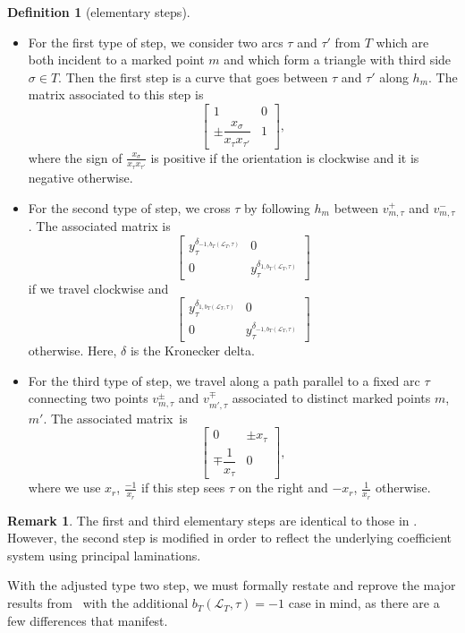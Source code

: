 \documentclass[pdftex]{sigma}
\numberwithin{equation}{section}
\theoremstyle{definition}
\newtheorem{Definition}[Theorem]{Definition}
\newtheorem{Remark}[Theorem]{Remark}
\begin{document}
\begin{Definition}[elementary steps]\label{definition:elementarysteps} \quad
\begin{itemize}\itemsep=0pt
\item For the first type of step, we consider two arcs $\tau$ and $\tau'$ from $T$ which are both incident to a marked point $m$ and which form a triangle with third side $\sigma\in T$. Then the first step is a curve that goes between $\tau$ and $\tau'$ along $h_m$. The matrix associated to this step is
\[
\left[\begin{matrix}
1 & 0\\
\pm\dfrac{x_{\sigma}}{x_{\tau}x_{\tau'}} & 1
\end{matrix}\right],
\]
where the sign of $\frac{x_{\sigma}}{x_{\tau}x_{\tau'}}$ is positive if the orientation is clockwise and it is negative otherwise.

\item For the second type of step, we cross $\tau$ by following $h_m$ between $v^{+}_{m, \tau}$ and $v^{-}_{m, \tau}$. The associated matrix is
\[
\begin{bmatrix}
y_{\tau}^{\delta_{-1, b_T(\mathcal{L}_T, \tau)}} & 0\\
0 & y_{\tau}^{\delta_{1, b_T(\mathcal{L}_T, \tau)}}
\end{bmatrix}
\] if we travel clockwise and{\samepage
\[
\begin{bmatrix}
y_{\tau}^{\delta_{1, b_T(\mathcal{L}_T, \tau)}} & 0\\
0 & y_{\tau}^{\delta_{-1, b_T(\mathcal{L}_T, \tau)}}
\end{bmatrix}
\] otherwise. Here, $\delta$ is the Kronecker delta.}

\item For the third type of step, we travel along a path parallel to a fixed arc $\tau$ connecting two points $v^{\pm}_{m, \tau}$ and $v^{\mp}_{m', \tau}$ associated to distinct marked points $m$, $m'$. The associated matrix~is
\[\begin{bmatrix}
0 & \pm x_{\tau}\\
\mp \dfrac{1}{x_{\tau}} & 0
\end{bmatrix},\] where we use $x_r$, $\frac{-1}{x_r}$ if this step sees $\tau$ on the right and $-x_r$, $\frac{1}{x_r}$ otherwise.
\end{itemize}

\begin{Remark}
The first and third elementary steps are identical to those in \cite{MW13}. However, the second step is modified in order to reflect the underlying coefficient system using principal laminations.
\end{Remark}

With the adjusted type two step, we must formally restate and reprove the major results from~\cite[Section 5]{MW13} with the additional $b_T(\mathcal{L}_T, \tau)=-1$ case in mind, as there are a few differences that manifest.

\end{Definition}
\end{document}
